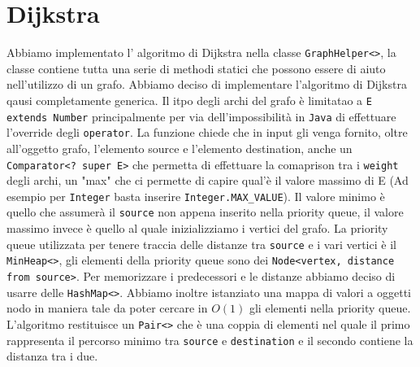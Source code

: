 \documentclass[12pt, letterpaper]{report}
\begin{document}
\section{Dijkstra}
Abbiamo implementato l' algoritmo di Dijkstra nella classe \verb|GraphHelper<>|, 
la classe contiene tutta una serie di methodi statici che possono essere di aiuto 
nell'utilizzo di un grafo. \newline
Abbiamo deciso di implementare l'algoritmo di Dijkstra qausi completamente generica.
Il itpo degli archi del grafo è limitatao a \verb|E extends Number| principalmente 
per via dell'impossibilità in \verb|Java| di effettuare l'override degli \verb|operator|.
\newline
La funzione chiede che in input gli venga fornito, oltre all'oggetto grafo, l'elemento 
source e l'elemento destination, anche un \verb|Comparator<? super E>| che 
permetta di effettuare la comaprison tra i \verb|weight| degli archi, un "max" che ci 
permette di capire qual'è il valore massimo di E (Ad esempio per \verb|Integer| basta inserire 
\verb|Integer.MAX_VALUE|). Il valore minimo è quello che assumerà il \verb|source| 
non appena inserito nella priority queue, il valore massimo invece è quello al 
quale inizializziamo i vertici del grafo. \newline
La priority queue utilizzata per tenere traccia delle distanze tra \verb|source| e
i vari vertici è il \verb|MinHeap<>|, gli elementi della priority queue sono dei 
\verb|Node<vertex, distance from source>|. \newline
Per memorizzare i predecessori e le distanze abbiamo deciso di usarre delle 
\verb|HashMap<>|. \newline
Abbiamo inoltre istanziato una mappa di valori a oggetti nodo in maniera tale da 
poter cercare in $O(1)$ gli elementi nella priority queue. \newline
L'algoritmo restituisce un \verb|Pair<>| che è una coppia di elementi nel quale il
primo rappresenta il percorso minimo tra \verb|source| e \verb|destination| e il 
secondo contiene la distanza tra i due.
\end{document}
